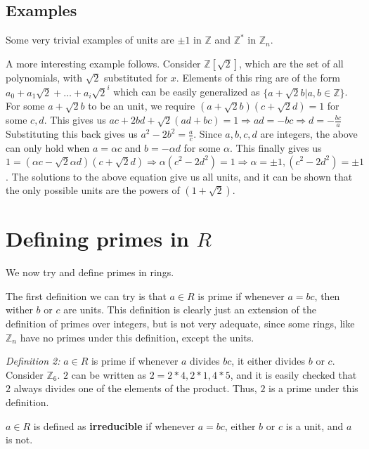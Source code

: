 \subsection{Examples}
Some very trivial examples of units are $\pm 1$ in $\mathbb{Z}$ and $\mathbb{Z}^{*}$ in $\mathbb{Z}_{n}$.
\par
A more interesting example follows.
Consider $\mathbb{Z}[\sqrt{2}]$, which are the set of all polynomials, with $\sqrt{2}$ substituted for $x$.
Elements of this ring are of the form $a_{0} + a_{1} \sqrt{2} + \dots + a_{i} \sqrt{2}^{i}$ which can be easily generalized as $\{ a + \sqrt{2} b | a, b \in \mathbb{Z} \}$.
For some $a+ \sqrt{2} b$ to be an unit, we require $(a + \sqrt{2}b)(c + \sqrt{2} d) = 1$ for some $c, d$.
This gives us $ac + 2bd + \sqrt{2} (ad + bc) = 1 \Rightarrow ad = -bc \Rightarrow d = -\frac{bc}{a}$
Substituting this back gives us $a^{2} - 2b^{2} = \frac{a}{c}$.
Since $a, b, c, d$ are integers, the above can only hold when $a = \alpha c$ and $b = -\alpha d$ for some $\alpha$.
This finally gives us $1 = (\alpha c - \sqrt{2} \alpha d)(c + \sqrt{2} d) \Rightarrow \alpha (c^{2} - 2d^{2}) = 1 \Rightarrow \alpha = \pm 1, (c^{2} - 2 d^{2}) = \pm 1$.
The solutions to the above equation give us all units, and it can be shown that the only possible units are the powers of $(1 + \sqrt{2})$.
\section{Defining primes in $R$}
We now try and define primes in rings.
\par
The first definition we can try is that $a \in R$ is prime if whenever $a = bc$, then wither $b$ or $c$ are units.
This definition is clearly just an extension of the definition of primes over integers, but is not very adequate, since some rings, like $\mathbb{Z}_{n}$ have no primes under this definition, except the units.
\par
\emph{Definition 2:} $a \in R$ is prime if whenever $a$ divides $bc$, it either divides $b$ or $c$.
Consider $\mathbb{Z}_{6}$.
$2$ can be written as $2 = 2*4, 2*1, 4*5$, and it is easily checked that $2$ always divides one of the elements of the product.
Thus, $2$ is a prime under this definition.
\par
$a \in R$ is defined as \textbf{irreducible} if whenever $a=bc$, either $b$ or $c$ is a unit, and $a$ is not.
